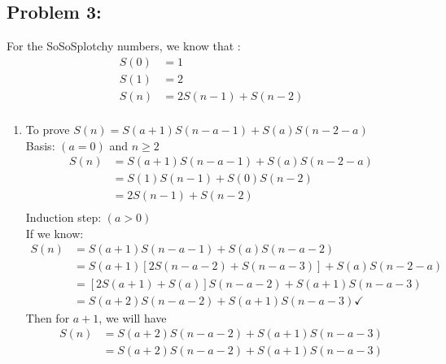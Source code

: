 \documentclass{article}
\begin{document}
\hypertarget{}{}
\subsection*{{Problem 3: }}

For the SoSoSplotchy numbers, we know that : 
\begin{align*} 
S(0) &= 1 \\
S(1) &=2 \\
S(n) &= 2S(n-1)+S(n-2) \\
\end{align*}
\begin{enumerate} [label=(\alph*)]
\item
To prove $S(n) = S(a+1)S(n-a-1) + S(a)S(n-2-a) $ \\
Basis:   $(a=0)$ and $n\geq2$ \\
\begin{align*} S(n)  &= S(a+1)S(n-a-1) + S(a)S(n-2-a) \\
	& = S(1)S(n-1) + S(0)S(n-2) \\
	& = 2S(n-1) + S(n-2)     \\
\end{align*} 
Induction step: $(a > 0)$  \\ 
If we know: 
\begin{align*} 
	S(n) & = S(a+1)S(n-a-1)+S(a)S(n-a-2)  \\
		& = S(a+1)[2S(n-a-2)+S(n-a-3)] + S(a)S(n-2-a) \\
		& = [2S(a+1) +S(a) ] S(n-a-2) + S(a+1) S(n-a-3)  \\ 
		& = S(a+2) S(n-a-2) + S(a+1) S(n-a-3)   \checkmark
\end{align*} 
Then for $a+1$, we will have 
\begin{align*} 
	S(n) & = S(a+2) S(n-a-2) + S(a+1) S(n-a-3) \\
		& = S(a+2)S(n-a-2) +S(a+1)S(n-a-3) \\
\end{align*}
	

\end{enumerate}
\end{document}
